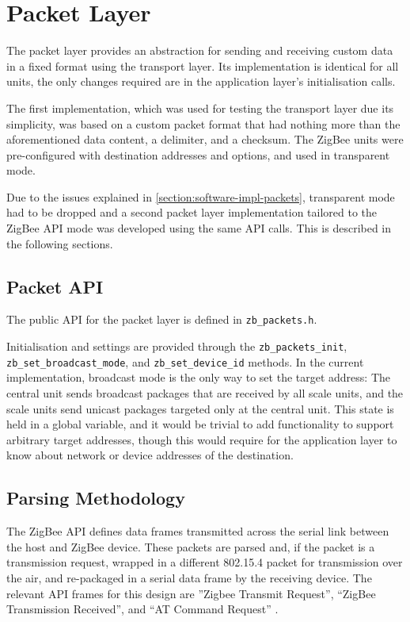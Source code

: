 \section{Packet Layer}
The packet layer provides an abstraction for sending and receiving custom data in a fixed format using the transport layer. Its implementation is identical for all units, the only changes required are in the application layer's initialisation calls.

The first implementation, which was used for testing the transport layer due its simplicity, was based on a custom packet format that had nothing more than the aforementioned data content, a delimiter, and a checksum. The ZigBee units were pre-configured with destination addresses and options, and used in transparent mode.

Due to the issues explained in \ref{section:software-impl-packets}, transparent mode had to be dropped and a second packet layer implementation tailored to the ZigBee API mode was developed using the same API calls. This is described in the following sections. 

\subsection{Packet API}
The public API for the packet layer is defined in \texttt{zb\_packets.h}. 

Initialisation and settings are provided through the \texttt{zb\_packets\_init}, \texttt{zb\_set\_broadcast\_mode}, and \texttt{zb\_set\_device\_id} methods. In the current implementation, broadcast mode is the only way to set the target address: The central unit sends broadcast packages that are received by all scale units, and the scale units send unicast packages targeted only at the central unit. This state is held in a global variable, and it would be trivial to add functionality to support arbitrary target addresses, though this would require for the application layer to know about network or device addresses of the destination.


\subsection{Parsing Methodology}
The ZigBee API defines data frames transmitted across the serial link between the host and ZigBee device. These packets are parsed and, if the packet is a transmission request, wrapped in a different 802.15.4 packet for transmission over the air, and re-packaged in a serial data frame by the receiving device. The relevant API frames for this design are ''Zigbee Transmit Request'', ``ZigBee Transmission Received'', and ``AT Command Request'' \cite[cf. section 6, API Operation]{xbee-datasheet}.

